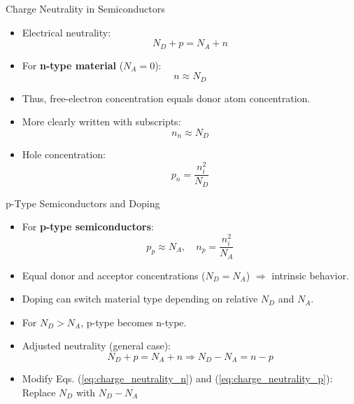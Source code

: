 \begin{frame}{Charge Neutrality in Semiconductors}
    \begin{itemize}
        \item Electrical neutrality:
        \begin{equation}
        N_D + p = N_A + n 
        \end{equation}
        \item For \textbf{n-type material} ($N_A = 0$):
        \begin{equation}
        n \approx N_D 
        \end{equation}
        \item Thus, free-electron concentration equals donor atom concentration.
        \item More clearly written with subscripts:
        \begin{equation} \label{eq:charge_neutrality_n}
        n_n \approx N_D 
        \end{equation}
        \item Hole concentration:
        \begin{equation} \label{eq:charge_neutrality_p}
        p_n = \frac{n_i^2}{N_D} 
        \end{equation}
    \end{itemize}
\end{frame}
\begin{frame}{p-Type Semiconductors and Doping}
    \begin{itemize}
        \item For \textbf{p-type semiconductors}:
        \begin{equation}
        p_p \approx N_A, \quad n_p = \frac{n_i^2}{N_A}
        \end{equation}
        \item Equal donor and acceptor concentrations ($N_D = N_A$) $\Rightarrow$ intrinsic behavior.
        \item Doping can switch material type depending on relative $N_D$ and $N_A$.
        \item For $N_D > N_A$, p-type becomes n-type.
        \item Adjusted neutrality (general case):
        \begin{equation}
        N_D + p = N_A + n \Rightarrow N_D - N_A = n - p
        \end{equation}
        \item Modify Eqs. (\ref{eq:charge_neutrality_n}) and (\ref{eq:charge_neutrality_p}): Replace $N_D$ with $N_D - N_A$
    \end{itemize}
\end{frame}
